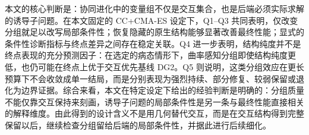 本文的核心判断是：协同进化中的变量组不仅是交互集合，也是后端必须实际求解的诱导子问题。在本文固定的 CC+CMA-ES 设定下，Q1--Q3 共同表明，仅改变分组就足以改写局部条件性；恢复隐藏的原生结构能够显著改善最终性能；显式的条件性诊断指标与终点差异之间存在稳定关联。Q4 进一步表明，结构纯度并不是终点表现的充分预测因子：在选定的病态情形下，曲率感知分组即使结构纯度更低，也仍可能在终点上优于交互优先基线 DG2。Q5 则说明，这类分组效应在更长预算下不会收敛成单一结局，而是分别表现为强烈持续、部分修复、较弱保留或退化为边界证据。综合来看，本文在特定设定下给出的经验判断是明确的：分组质量不能仅靠交互保持来刻画，诱导子问题的局部条件性是另一条与最终性能直接相关的解释维度。由此得到的设计含义不是用几何替代交互，而是在交互结构得到完整保留以后，继续检查分组留给后端的局部条件性，并据此进行后续细化。
